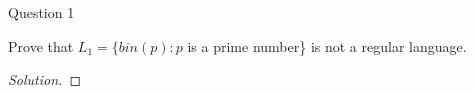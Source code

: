 \begin{solution}{Question 1}\label{ques:1}
    \begin{question}
    Prove that $L_1 = \{bin(p) : p$ is a prime number\} is not a regular language.
    \end{question}
    \tcblower{}
    \begin{proof}[Solution]
    \end{proof}
\end{solution}
